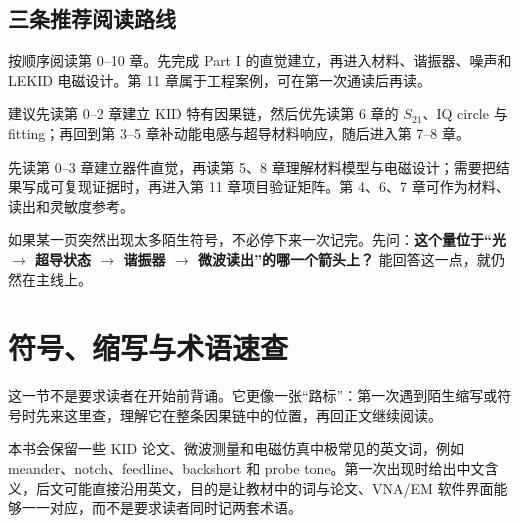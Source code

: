 \documentclass[11pt,a4paper,openany]{ctexrep}
\begin{document}
\section*{三条推荐阅读路线}
\begin{tcolorbox}[colback=white,colframe=KidBlue!55,arc=2mm,title=路线 A：完全初学者,fonttitle=\bfseries]
按顺序阅读第 0--10 章。先完成 Part I 的直觉建立，再进入材料、谐振器、噪声和 LEKID 电磁设计。第 11 章属于工程案例，可在第一次通读后再读。
\end{tcolorbox}

\begin{tcolorbox}[colback=white,colframe=KidTeal!65,arc=2mm,title=路线 B：已有 RF / 微波背景,fonttitle=\bfseries]
建议先读第 0--2 章建立 KID 特有因果链，然后优先读第 6 章的 $S_{21}$、IQ circle 与 fitting；再回到第 3--5 章补动能电感与超导材料响应，随后进入第 7--8 章。
\end{tcolorbox}

\begin{tcolorbox}[colback=white,colframe=KidGold!80!black,arc=2mm,title=路线 C：主要目标是 LEKID 仿真与器件设计,fonttitle=\bfseries]
先读第 0--3 章建立器件直觉，再读第 5、8 章理解材料模型与电磁设计；需要把结果写成可复现证据时，再进入第 11 章项目验证矩阵。第 4、6、7 章可作为材料、读出和灵敏度参考。
\end{tcolorbox}

\begin{checkpointbox}
如果某一页突然出现太多陌生符号，不必停下来一次记完。先问：\textbf{这个量位于“光 $\rightarrow$ 超导状态 $\rightarrow$ 谐振器 $\rightarrow$ 微波读出”的哪一个箭头上？} 能回答这一点，就仍然在主线上。
\end{checkpointbox}

\chapter*{符号、缩写与术语速查}

这一节不是要求读者在开始前背诵。它更像一张“路标”：第一次遇到陌生缩写或符号时先来这里查，理解它在整条因果链中的位置，再回正文继续阅读。

\begin{intuitionbox}
本书会保留一些 KID 论文、微波测量和电磁仿真中极常见的英文词，例如 meander、notch、feedline、backshort 和 probe tone。第一次出现时给出中文含义，后文可能直接沿用英文，目的是让教材中的词与论文、VNA/EM 软件界面能够一一对应，而不是要求读者同时记两套术语。
\end{intuitionbox}
\end{document}
